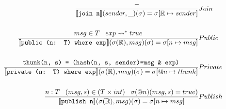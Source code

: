 \documentclass[acmsmall,review,anonymous]{acmart}\settopmatter{printfolios=true}
\begin{document}
\newcommand{\owner}{\mathbb{R}}
\begin{align*}
	\judge{&Join}{
		-
	}{
		\semfunc[\text{join n}](sender, \_)(\sigma) = \sigma [ \owner \mapsto sender]
	}\\
	\\
	\judge{&Public}{
		msg \in T \; \; \; exp \leadsto^* true
	}{
		\semfunc[\text{public (n: T) where exp}](\sigma(\owner), msg)(\sigma) = \sigma [n \mapsto msg]
	}\\
	\\
	\judge{&Private}{
		\texttt{thunk(n, s) = (hash(n, s, sender)=msg \& exp)}
	}{
		\semfunc[\text{private (n: T) where exp}](\sigma(\owner), msg)(\sigma) = \sigma [@n \mapsto thunk]
	}\\
	\\
	\judge{&Publish}{
		n : T \;\;\; (msg, s) \in (T \times int) \;\;\; \sigma(@n)(msg, s) = true)
	}{
		\semfunc[\text{publish n}](\sigma(\owner), msg)(\sigma) = \sigma [n \mapsto msg]
	}
\end{align*}






\newpage

%



\newpage


% 

%
\end{document}

